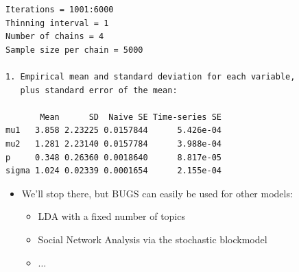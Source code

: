 \documentclass{beamer}
\begin{document}
\begin{frame}[fragile]
  \begin{verbatim}
Iterations = 1001:6000
Thinning interval = 1 
Number of chains = 4 
Sample size per chain = 5000 

1. Empirical mean and standard deviation for each variable,
   plus standard error of the mean:

       Mean      SD  Naive SE Time-series SE
mu1   3.858 2.23225 0.0157844      5.426e-04
mu2   1.281 2.23140 0.0157784      3.988e-04
p     0.348 0.26360 0.0018640      8.817e-05
sigma 1.024 0.02339 0.0001654      2.155e-04
  \end{verbatim}
\end{frame}

\begin{frame}
  \begin{itemize}
    \item{We'll stop there, but BUGS can easily be used for other models:}
    \begin{itemize}
      \item{LDA with a fixed number of topics}
      \item{Social Network Analysis via the stochastic blockmodel}
      \item{$\ldots$}
    \end{itemize}
  \end{itemize}
\end{frame}
\end{document}
